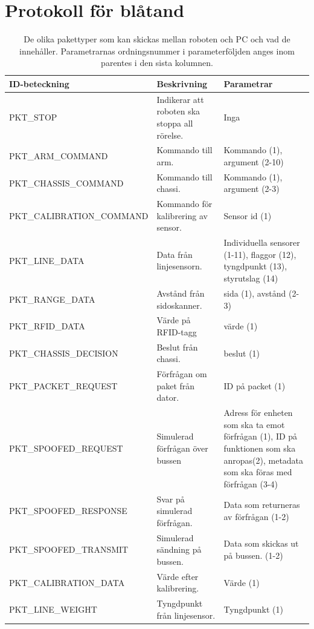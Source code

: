 \section{Protokoll för blåtand}
\label{sec:blue}
\begin{table}[H]
\begin{tabularx}{\textwidth}{|l|X|X|}
\hline
\textbf{ID-beteckning} & \textbf{Beskrivning} & \textbf{Parametrar} \\ \hline
PKT\_STOP & Indikerar att roboten ska stoppa all rörelse. & Inga \\ \hline
PKT\_ARM\_COMMAND & Kommando till arm. & Kommando (1), argument (2-10) \\ \hline
PKT\_CHASSIS\_COMMAND & Kommando till chassi. & Kommando (1), argument (2-3) \\ \hline
PKT\_CALIBRATION\_COMMAND & Kommando för kalibrering av sensor. & Sensor id (1) \\ \hline
PKT\_LINE\_DATA & Data från linjesensorn. & Individuella sensorer (1-11), flaggor (12), tyngdpunkt (13), styrutslag (14) \\ \hline
PKT\_RANGE\_DATA & Avstånd från sidoskanner. & sida (1), avstånd (2-3) \\ \hline
PKT\_RFID\_DATA & Värde på RFID-tagg & värde (1) \\ \hline
PKT\_CHASSIS\_DECISION & Beslut från chassi. & beslut (1) \\ \hline
PKT\_PACKET\_REQUEST & Förfrågan om paket från dator. & ID på packet (1) \\ \hline
PKT\_SPOOFED\_REQUEST & Simulerad förfrågan över bussen & Adress för enheten som ska ta emot förfrågan (1), ID på funktionen som ska anropas(2), metadata som ska föras med förfrågan (3-4) \\ \hline
PKT\_SPOOFED\_RESPONSE & Svar på simulerad förfrågan. & Data som returneras av förfrågan (1-2) \\ \hline
PKT\_SPOOFED\_TRANSMIT & Simulerad sändning på bussen. & Data som skickas ut på bussen. (1-2) \\ \hline
PKT\_CALIBRATION\_DATA & Värde efter kalibrering. & Värde (1) \\ \hline
PKT\_LINE\_WEIGHT & Tyngdpunkt från linjesensor. & Tyngdpunkt (1) \\ \hline
\end{tabularx}
\caption{De olika pakettyper som kan skickas mellan roboten och PC och vad de innehåller. Parametrarnas ordningsnummer i parameterföljden anges inom parentes i den sista kolumnen.}
\label{tab:packets}
\end{table}

